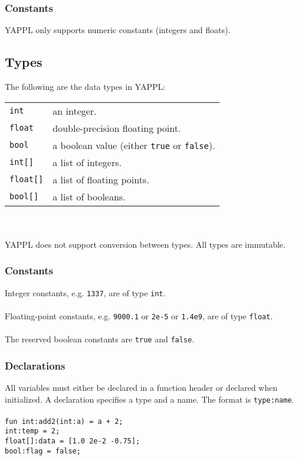 \subsubsection{Constants}

YAPPL only supports numeric constants (integers and floats).

\subsection{Types}

The following are the data types in YAPPL:\\
\begin{tabular}{l l}
\texttt{int} & an integer.\\
\texttt{float} & double-precision floating point.\\
\texttt{bool} & a boolean value (either \texttt{true} or \texttt{false}).\\
\texttt{int[]} & a list of integers.\\
\texttt{float[]} & a list of floating points.\\
\texttt{bool[]} & a list of booleans.
\end{tabular}\\\\
YAPPL does not support conversion between types. All types are immutable.

\subsubsection{Constants}
Integer constants, e.g. \texttt{1337}, are of type \texttt{int}.\\\\
Floating-point constants, e.g. \texttt{9000.1} or \texttt{2e-5} or \texttt{1.4e9}, are of type \texttt{float}.\\\\
The reserved boolean constants are \texttt{true} and \texttt{false}.

\subsubsection{Declarations}
All variables must either be declared in a function header or declared when initialized. A declaration specifies a type and a name. The format is \texttt{type:name}.\\\\
\texttt{fun int:add2(int:a) = a + 2;}\\
\texttt{int:temp = 2;}\\
\texttt{float[]:data = [1.0 2e-2 -0.75];}\\
\texttt{bool:flag = false;}


